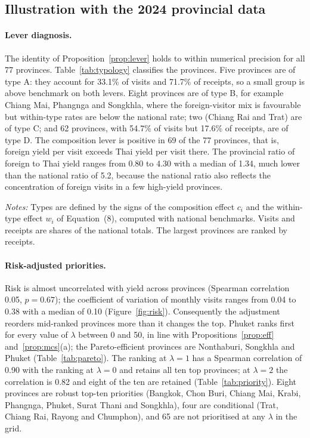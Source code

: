 \documentclass[11pt,a4paper]{article}
\theoremstyle{plain}\newtheorem{proposition}{Proposition}
\theoremstyle{definition}\newtheorem{definition}{Definition}
\begin{document}
\subsection{Illustration with the 2024 provincial data}
\paragraph{Lever diagnosis.} The identity of Proposition~\ref{prop:lever} holds to within numerical precision for all 77 provinces. Table~\ref{tab:typology} classifies the provinces. Five provinces are of type A: they account for 33.1\% of visits and 71.7\% of receipts, so a small group is above benchmark on both levers. Eight provinces are of type B, for example Chiang Mai, Phangnga and Songkhla, where the foreign-visitor mix is favourable but within-type rates are below the national rate; two (Chiang Rai and Trat) are of type C; and 62 provinces, with 54.7\% of visits but 17.6\% of receipts, are of type D. The composition lever is positive in 69 of the 77 provinces, that is, foreign yield per visit exceeds Thai yield per visit there. The provincial ratio of foreign to Thai yield ranges from 0.80 to 4.30 with a median of 1.34, much lower than the national ratio of 5.2, because the national ratio also reflects the concentration of foreign visits in a few high-yield provinces.

\begin{table}[t]\centering\scriptsize
\caption{Lever types of the 77 provinces, 2024}\label{tab:typology}
\resizebox{\textwidth}{!}{}\par\smallskip
\parbox{\textwidth}{\scriptsize\emph{Notes:} Types are defined by the signs of the composition effect $c_i$ and the within-type effect $w_i$ of Equation~(8), computed with national benchmarks. Visits and receipts are shares of the national totals. The largest provinces are ranked by receipts.}
\end{table}

\paragraph{Risk-adjusted priorities.} Risk is almost uncorrelated with yield across provinces (Spearman correlation 0.05, $p=0.67$); the coefficient of variation of monthly visits ranges from 0.04 to 0.38 with a median of 0.10 (Figure~\ref{fig:risk}). Consequently the adjustment reorders mid-ranked provinces more than it changes the top. Phuket ranks first for every value of $\lambda$ between 0 and 50, in line with Propositions~\ref{prop:eff} and~\ref{prop:mcs}(a); the Pareto-efficient provinces are Nonthaburi, Songkhla and Phuket (Table~\ref{tab:pareto}). The ranking at $\lambda=1$ has a Spearman correlation of 0.90 with the ranking at $\lambda=0$ and retains all ten top provinces; at $\lambda=2$ the correlation is 0.82 and eight of the ten are retained (Table~\ref{tab:priority}). Eight provinces are robust top-ten priorities (Bangkok, Chon Buri, Chiang Mai, Krabi, Phangnga, Phuket, Surat Thani and Songkhla), four are conditional (Trat, Chiang Rai, Rayong and Chumphon), and 65 are not prioritised at any $\lambda$ in the grid.
\end{document}
